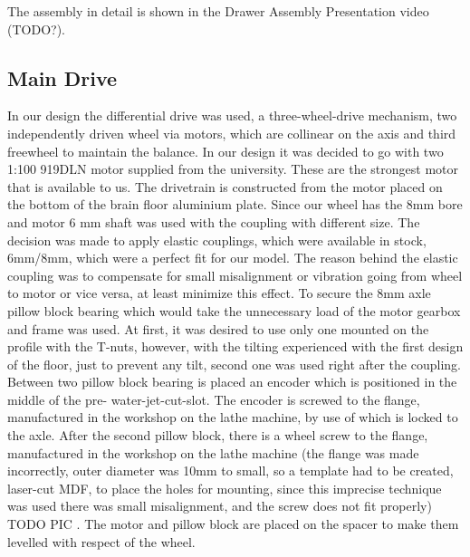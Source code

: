 \documentclass[11pt]{article}
\begin{document}
The assembly in detail is shown in the Drawer Assembly Presentation video (TODO?). 

\subsection*{Main Drive}

In our design the differential drive was used, a three-wheel-drive mechanism, two independently driven wheel via motors, which are collinear on the axis and third freewheel to maintain the balance. In our design it was decided to go with two 1:100 919DLN motor supplied from the university. These are the strongest motor that is available to us. The drivetrain is constructed from the motor placed on the bottom of the brain floor aluminium plate. Since our wheel has the 8mm bore and motor 6 mm shaft was used with the coupling with different size. The decision was made to apply elastic couplings, which were available in stock, 6mm/8mm, which were a perfect fit for our model. The reason behind the elastic coupling was to compensate for small misalignment or vibration going from wheel to motor or vice versa, at least minimize this effect. To secure the 8mm axle pillow block bearing which would take the unnecessary load of the motor gearbox and frame was used. At first, it was desired to use only one mounted on the profile with the T-nuts, however, with the tilting experienced with the first design of the floor, just to prevent any tilt, second one was used right after the coupling. Between two pillow block bearing is placed an encoder which is positioned in the middle of the pre- water-jet-cut-slot. The encoder is screwed to the flange, manufactured in the workshop on the lathe machine, by use of which is locked to the axle. After the second pillow block, there is a wheel screw to the flange, manufactured in the workshop on the lathe machine (the flange was made incorrectly, outer diameter was 10mm to small, so a template had to be created, laser-cut MDF, to place the holes for mounting, since this imprecise technique was used there was small misalignment, and the screw does not fit properly) TODO PIC . The motor and pillow block are placed on the spacer to make them levelled with respect of the wheel.
\end{document}
